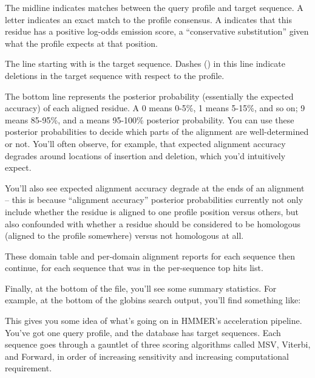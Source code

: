 The midline indicates matches between the query profile and target
sequence. A letter indicates an exact match to the profile consensus.
A \mono{+} indicates that this residue has a positive log-odds
emission score, a ``conservative substitution'' given what the profile
expects at that position.

The line starting with  is the target sequence.
Dashes (\mono{-}) in this line indicate deletions in the target
sequence with respect to the profile.

The bottom line represents the posterior
probability (essentially the expected accuracy) of each aligned
residue. A 0 means 0-5\%, 1 means 5-15\%, and so on; 9 means 85-95\%,
and a \mono{*} means 95-100\% posterior probability. You can use these
posterior probabilities to decide which parts of the alignment are
well-determined or not. You'll often observe, for example, that
expected alignment accuracy degrades around locations of insertion and
deletion, which you'd intuitively expect. 

You'll also see expected alignment accuracy degrade at the ends of an
alignment -- this is because ``alignment accuracy'' posterior
probabilities currently not only include whether the residue is
aligned to one profile position versus others, but also confounded with
whether a residue should be considered to be homologous (aligned to
the profile somewhere) versus not homologous at all.


These domain table and per-domain alignment reports for each sequence
then continue, for each sequence that was in the per-sequence top hits
list.

Finally, at the bottom of the file, you'll see some summary
statistics.  For example, at the bottom of the globins search output,
you'll find something like:


This gives you some idea of what's going on in HMMER's acceleration
pipeline. You've got one query profile, and the database has \UNInseq{}
target sequences. Each sequence goes through a gauntlet of three
scoring algorithms called MSV, Viterbi, and Forward, in order of 
increasing sensitivity and increasing computational requirement. 

